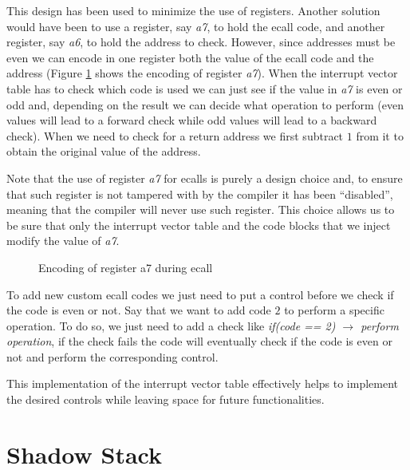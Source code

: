 This design has been used to minimize the use of registers. Another solution
would have been to use a register, say \textit{a7}, to hold the ecall code, and
another register, say \textit{a6}, to hold the address to check. However, since addresses
must be even we can encode in one register both the value of the ecall code and the
address (Figure \ref{fig:ecall} shows the encoding of register \textit{a7}). When
the interrupt vector table has to check which code is used we can just see if the
value in \textit{a7} is even or odd and, depending on the result we can decide what
operation to perform (even values will lead to a forward check while odd values
will lead to a backward check). When we need to check for a return address we
first subtract $1$ from it to obtain the original value of the address.

Note that the use of register \textit{a7} for ecalls is purely a design choice and,
to ensure that such register is not tampered with by the compiler it has been ``disabled'',
meaning that the compiler will never use such register. This choice allows us to
be sure that only the interrupt vector table and the code blocks that we inject
modify the value of \textit{a7}.

\begin{figure}[htbp]
  \centering
  \def\stackalignment{r} %
  {\scriptsize }
  \caption{Encoding of register a7 during ecall}
  \label{fig:ecall}
\end{figure}

To add new custom ecall codes we just need to put a control before we check if
the code is even or not. Say that we want to add code $2$ to perform a specific operation.
To do so, we just need to add a check like \textit{if(code == 2) $\rightarrow$
perform operation}, if the check fails the code will eventually check if the code
is even or not and perform the corresponding control.

This implementation of the interrupt vector table effectively helps to implement
the desired controls while leaving space for future functionalities.

\section{Shadow Stack}
\label{sec:project_ss}

